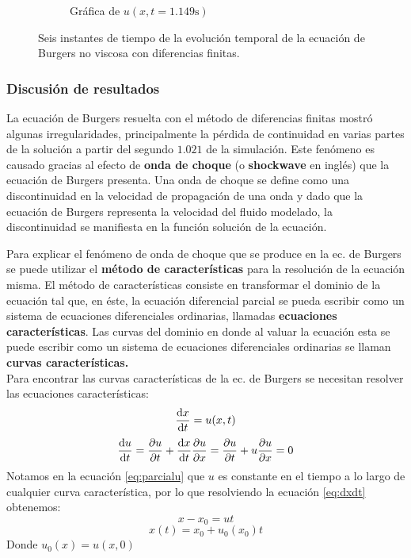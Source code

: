 \documentclass[12pt]{article}
\begin{document}
\begin{figure}[ht]
\begin{subfigure}{0.4\textwidth}
			\caption*{Gráfica de $u(x,t=1.149\unit{\second})$}
			\label{fig:b1ddf6}
		\end{subfigure}
		\caption{Seis instantes de tiempo de la evolución temporal de la ecuación de Burgers no viscosa con diferencias finitas.}
		\label{fig:instantesB1DDF}
	\end{figure}
	
	
	\subsubsection{Discusión de resultados}
	\label{sec:discusion}
	La ecuación de Burgers resuelta con el método de diferencias finitas mostró algunas irregularidades, principalmente la pérdida de continuidad en varias partes de la solución a partir del segundo $1.021$ de la simulación. Este fenómeno es causado gracias al efecto de \textbf{onda de choque}  (o \textbf{shockwave} en inglés) que la ecuación de Burgers presenta. Una onda de choque se define como una discontinuidad en la velocidad de propagación de una onda y dado que la ecuación de Burgers representa la velocidad del fluido modelado, la discontinuidad se manifiesta en la función solución de la ecuación.
	
	Para explicar el fenómeno de onda de choque que se produce en la ec. de Burgers se puede utilizar el \textbf{método de características} para la resolución de la ecuación misma. El método de características consiste en transformar el dominio de la ecuación tal que, en éste, la ecuación diferencial parcial se pueda escribir como un sistema de ecuaciones diferenciales ordinarias, llamadas \textbf{ecuaciones características}. Las curvas del dominio en donde al valuar la ecuación esta se puede escribir como un sistema de ecuaciones diferenciales ordinarias se llaman \textbf{curvas características.}\\
	Para encontrar las curvas características de la ec. de Burgers se necesitan resolver las ecuaciones características: 
	\begin{equation}
		\dv{x}{t} = u(x,t)
		\label{eq:dxdt}
	\end{equation}
	\begin{equation}
		\dv{u}{t} = \pdv{u}{t} + \dv{x}{t}\pdv{u}{x} = \pdv{u}{t}+u\pdv{u}{x} = 0
		\label{eq:parcialu}
	\end{equation}
	Notamos en la ecuación \ref{eq:parcialu} que $u$ es constante en el tiempo a lo largo de cualquier curva característica, por lo que resolviendo la ecuación \ref{eq:dxdt} obtenemos:
	\begin{equation}
		x-x_{0} = ut
	\end{equation}
	\begin{equation}
		x(t) = x_{0} + u_{0}(x_0)t
		\label{eq:caracteristica}
	\end{equation}
	Donde $u_0(x) = u(x,0)$
	
\end{document}
